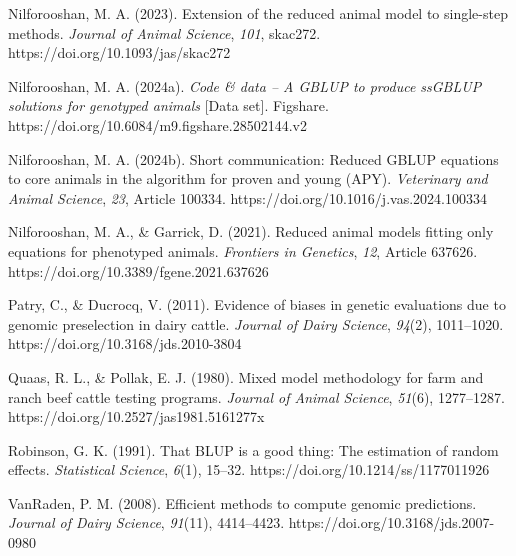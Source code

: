 \documentclass[authordate, empirical]{jote-new-article}
\begin{document}
	Nilforooshan, M. A. (2023). Extension of the reduced animal model to single-step methods. \emph{Journal of Animal Science}, \emph{101}, skac272. https://doi.org/10.1093/jas/skac272



	Nilforooshan, M. A. (2024a). \emph{Code \& data -- A GBLUP to produce ssGBLUP solutions for genotyped animals} [Data set]. Figshare. https://doi.org/10.6084/m9.figshare.28502144.v2



	Nilforooshan, M. A. (2024b). Short communication: Reduced GBLUP equations to core animals in the algorithm for proven and young (APY). \emph{Veterinary and Animal Science}, \emph{23}, Article 100334. https://doi.org/10.1016/j.vas.2024.100334



	Nilforooshan, M. A., \& Garrick, D. (2021). Reduced animal models fitting only equations for phenotyped animals. \emph{Frontiers in Genetics}, \emph{12}, Article 637626. https://doi.org/10.3389/fgene.2021.637626



	Patry, C., \& Ducrocq, V. (2011). Evidence of biases in genetic evaluations due to genomic preselection in dairy cattle. \emph{Journal of Dairy Science}, \emph{94}(2), 1011--1020. https://doi.org/10.3168/jds.2010-3804



	Quaas, R. L., \& Pollak, E. J. (1980). Mixed model methodology for farm and ranch beef cattle testing programs. \emph{Journal of Animal Science}, \emph{51}(6), 1277--1287. https://doi.org/10.2527/jas1981.5161277x



	Robinson, G. K. (1991). That BLUP is a good thing: The estimation of random effects. \emph{Statistical Science}, \emph{6}(1), 15--32. https://doi.org/10.1214/ss/1177011926



	VanRaden, P. M. (2008). Efficient methods to compute genomic predictions. \emph{Journal of Dairy Science}, \emph{91}(11), 4414--4423. https://doi.org/10.3168/jds.2007-0980
\end{document}
